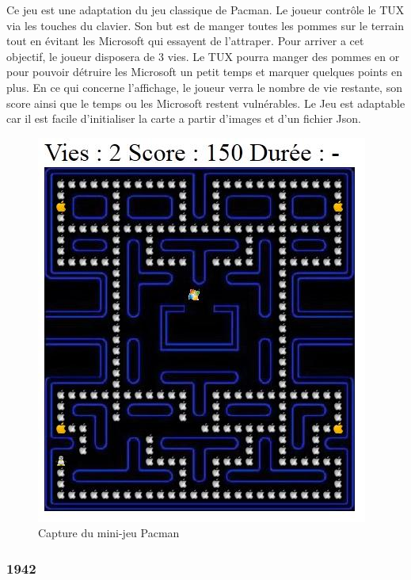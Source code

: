 Ce jeu est une adaptation du jeu classique de Pacman. 
Le joueur contrôle le TUX via les touches du clavier. 
Son but est de manger toutes les pommes sur le terrain tout en évitant les Microsoft qui essayent de l’attraper. 
Pour arriver a cet objectif, le joueur disposera de 3 vies. Le TUX pourra manger des pommes en or pour pouvoir détruire les Microsoft 
un petit temps et marquer quelques points en plus. En ce qui concerne l’affichage, le joueur verra le nombre de vie restante, 
son score ainsi que le temps ou les Microsoft restent vulnérables. Le Jeu est adaptable car il est facile d’initialiser 
la carte a partir d’images et d’un fichier Json.

\begin{figure}
 \includegraphics[width=\linewidth]{img/capturejeu_pacman}
 \caption{Capture du mini-jeu Pacman}
 \label{fig:game_pacman}
\end{figure}

\subsubsection{1942}

